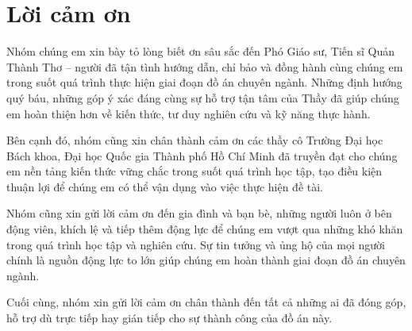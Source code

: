 \section*{Lời cảm ơn}
\thispagestyle{empty}
Nhóm chúng em xin bày tỏ lòng biết ơn sâu sắc đến Phó Giáo sư, Tiến sĩ Quản Thành Thơ – người đã tận tình hướng dẫn, chỉ bảo và đồng hành cùng chúng em trong suốt quá trình thực hiện giai đoạn đồ án chuyên ngành. Những định hướng quý báu, những góp ý xác đáng cùng sự hỗ trợ tận tâm của Thầy đã giúp chúng em hoàn thiện hơn về kiến thức, tư duy nghiên cứu và kỹ năng thực hành. 

Bên cạnh đó, nhóm cũng xin chân thành cảm ơn các thầy cô Trường Đại học Bách khoa, Đại học Quốc gia Thành phố Hồ Chí Minh đã truyền đạt cho chúng em nền tảng kiến thức vững chắc trong suốt quá trình học tập, tạo điều kiện thuận lợi để chúng em có thể vận dụng vào việc thực hiện đề tài. 

Nhóm cũng xin gửi lời cảm ơn đến gia đình và bạn bè, những người luôn ở bên động viên, khích lệ và tiếp thêm động lực để chúng em vượt qua những khó khăn trong quá trình học tập và nghiên cứu. Sự tin tưởng và ủng hộ của mọi người chính là nguồn động lực to lớn giúp chúng em hoàn thành giai đoạn đồ án chuyên ngành. 

Cuối cùng, nhóm xin gửi lời cảm ơn chân thành đến tất cả những ai đã đóng góp, hỗ trợ dù trực tiếp hay gián tiếp cho sự thành công của đồ án này.
\clearpage
{}

